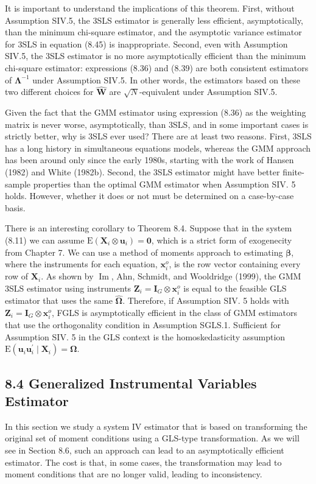 \documentclass[10pt]{article}
\begin{document}
It is important to understand the implications of this theorem. First, without Assumption SIV.5, the 3SLS estimator is generally less efficient, asymptotically, than the minimum chi-square estimator, and the asymptotic variance estimator for 3SLS in equation (8.45) is inappropriate. Second, even with Assumption SIV.5, the 3SLS estimator is no more asymptotically efficient than the minimum chi-square estimator: expressions (8.36) and (8.39) are both consistent estimators of $\boldsymbol{\Lambda}^{-1}$ under Assumption SIV.5. In other words, the estimators based on these two different choices for $\hat{\mathbf{W}}$ are $\sqrt{N}$-equivalent under Assumption SIV.5.

Given the fact that the GMM estimator using expression (8.36) as the weighting matrix is never worse, asymptotically, than 3SLS, and in some important cases is strictly better, why is 3SLS ever used? There are at least two reasons. First, 3SLS has a long history in simultaneous equations models, whereas the GMM approach has been around only since the early 1980s, starting with the work of Hansen (1982) and White (1982b). Second, the 3SLS estimator might have better finite-sample properties than the optimal GMM estimator when Assumption SIV. 5 holds. However, whether it does or not must be determined on a case-by-case basis.

There is an interesting corollary to Theorem 8.4. Suppose that in the system (8.11) we can assume $\mathrm{E}\left(\mathbf{X}_{i} \otimes \mathbf{u}_{i}\right)=\mathbf{0}$, which is a strict form of exogenecity from Chapter 7. We can use a method of moments approach to estimating $\boldsymbol{\beta}$, where the instruments for each equation, $\mathbf{x}_{i}^{o}$, is the row vector containing every row of $\mathbf{X}_{i}$. As shown by $\operatorname{Im}$, Ahn, Schmidt, and Wooldridge (1999), the GMM 3SLS estimator using instruments $\mathbf{Z}_{i}=\mathbf{I}_{G} \otimes \mathbf{x}_{i}^{o}$ is equal to the feasible GLS estimator that uses the same $\hat{\boldsymbol{\Omega}}$. Therefore, if Assumption SIV. 5 holds with $\mathbf{Z}_{i}=\mathbf{I}_{G} \otimes \mathbf{x}_{i}^{o}$, FGLS is asymptotically efficient in the class of GMM estimators that use the orthogonality condition in Assumption SGLS.1. Sufficient for Assumption SIV. 5 in the GLS context is the homoskedasticity assumption $\mathrm{E}\left(\mathbf{u}_{i} \mathbf{u}_{i}^{\prime} \mid \mathbf{X}_{i}\right)=\boldsymbol{\Omega}$.

\subsection*{8.4 Generalized Instrumental Variables Estimator}
In this section we study a system IV estimator that is based on transforming the original set of moment conditions using a GLS-type transformation. As we will see in Section 8.6, such an approach can lead to an asymptotically efficient estimator. The cost is that, in some cases, the transformation may lead to moment conditions that are no longer valid, leading to inconsistency.
\end{document}
